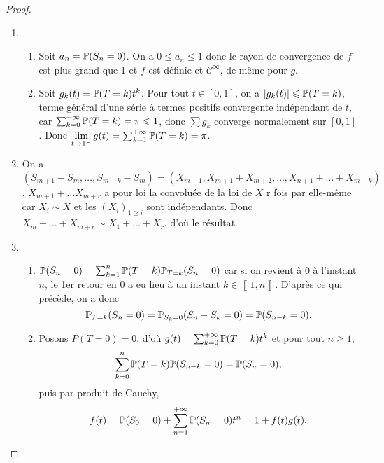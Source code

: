 \documentclass[12pt]{article}
\begin{document}
\begin{proof}
    \phantom{}
    \begin{enumerate}
        \item 
        \begin{enumerate}
            \item Soit $a_n=\P(S_n=0)$. On a $0\leqslant a_n\leqslant1$ donc le rayon de convergence de $f$ est plus grand que 1 et $f$ est définie et $\mathcal{C}^{\infty}$, de même pour $g$.
            \item Soit $g_k(t)=\P(T=k)t^{k}$. Pour tout $t\in[0,1]$, on a $\left\lvert g_k(t)\right\rvert\leqslant\P(T=k)$, terme général d'une série à termes positifs convergente indépendant de $t$, car $\sum_{k=0}^{+\infty}\P(T=k)=\pi\leqslant1$, donc $\sum g_k$ converge normalement sur $[0,1]$. Donc $\lim\limits_{t\to1^{-}}g(t)=\sum_{k=1}^{+\infty}\P(T=k)=\pi$.
        \end{enumerate}

        \item On a $(S_{m+1}-S_m,\dots,S_{m+k}-S_{m})=(X_{m+1},X_{m+1}+X_{m+2},\dots,X_{n+1}+\dots+X_{m+k})$. $X_{m+1}+\dots X_{m+r}$ a pour loi la convoluée de la loi de $X$ r fois par elle-même car $X_i\sim X$ et les $(X_i)_{1\geqslant i}$ sont indépendants. Donc $X_m+\dots+X_{m+r}\sim X_1+\dots+X_r$, d'où le résultat.
        
        \item 
        \begin{enumerate}
            \item $\P(S_n=0)=\sum_{k=1}^{n}\P(T=k)\P_{T=k}(S_n=0)$ car si on revient à 0 à l'instant $n$, le 1er retour en 0 a eu lieu à un instant $k\in\left\llbracket1,n\right\rrbracket$. D'après ce qui précède, on a donc 
            \begin{equation}
                \P_{T=k}(S_n=0)=\P_{S_k=0}(S_n-S_k=0)=\P(S_{n-k}=0).
            \end{equation}

            \item Posons $P(T=0)=0$, d'où $g(t)=\sum_{k=0}^{+\infty}\P(T=k)t^{k}$ et pour tout $n\geqslant1$,
            \begin{equation}
                \sum_{k=0}^{n}\P(T=k)\P(S_{n-k}=0)=\P(S_n=0),
            \end{equation}
            puis par produit de Cauchy, 
            \begin{equation}
                f(t)=\P(S_0=0)+\sum_{n=1}^{+\infty}\P(S_n=0)t^{n}=1+f(t)g(t).
            \end{equation}
        \end{enumerate}


\end{enumerate}
\end{proof}
\end{document}
